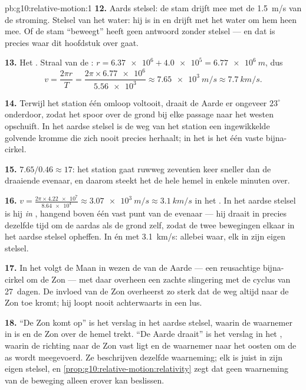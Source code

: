 \begin{solution}{pb:g10:relative-motion:1}
\textbf{12.} Aards stelsel: de stam drijft mee met de \qty{1.5}{m/s} van
de stroming. Stelsel van het water: hij is in  en drijft met het
water om hem heen mee. Of de stam ``beweegt'' heeft geen antwoord zonder
stelsel --- en dat is precies waar dit hoofdstuk over gaat.

\textbf{13.} Het . Straal van de :
$r = \num{6.37e6} + \num{4.0e5} = \qty{6.77e6}{m}$, dus
\[
v = \frac{2\pi r}{T} = \frac{2\pi \times \num{6.77e6}}{\num{5.56e3}}
\approx \qty{7.65e3}{m/s} \approx \qty{7.7}{km/s}.
\]

\textbf{14.} Terwijl het station één omloop voltooit, draait de Aarde er
ongeveer $23^\circ$ onderdoor, zodat het spoor over de grond bij elke
passage naar het westen opschuift. In het aardse stelsel is de weg van
het station een ingewikkelde golvende kromme die zich nooit precies
herhaalt; in het  is het één vaste bijna-cirkel.

\textbf{15.} $7.65 / 0.46 \approx 17$: het station gaat ruwweg
zeventien keer sneller dan de draaiende evenaar, en daarom steekt het de
hele hemel in enkele minuten over.

\textbf{16.} $v = \frac{2\pi \times \num{4.22e7}}{\num{8.64e4}}
\approx \qty{3.07e3}{m/s} \approx \qty{3.1}{km/s}$ in het . In het aardse stelsel is hij \emph{in }, hangend boven één
vast punt van de evenaar --- hij draait in precies dezelfde tijd om de
aardas als de grond zelf, zodat de twee bewegingen elkaar in het aardse
stelsel opheffen. In  én met \qty{3.1}{km/s}: allebei waar, elk in
zijn eigen stelsel.

\textbf{17.} In het  volgt de Maan in wezen de
 van de Aarde --- een reusachtige bijna-cirkel om de Zon ---
met daar overheen een zachte slingering met de cyclus van \qty{27}{dagen}.
De invloed van de Zon overheerst zo sterk dat de weg altijd naar de Zon
toe kromt; hij loopt nooit achterwaarts in een lus.

\textbf{18.} ``De Zon komt op'' is het verslag in het aardse stelsel,
waarin de waarnemer in  is en de Zon over de hemel trekt. ``De Aarde
draait'' is het verslag in het , waarin de richting
naar de Zon vast ligt en de waarnemer naar het oosten om de as wordt
meegevoerd. Ze beschrijven dezelfde waarneming; elk is juist in zijn
eigen stelsel, en \cref{prop:g10:relative-motion:relativity} zegt dat
geen waarneming van de beweging alleen erover kan beslissen.


\end{solution}
